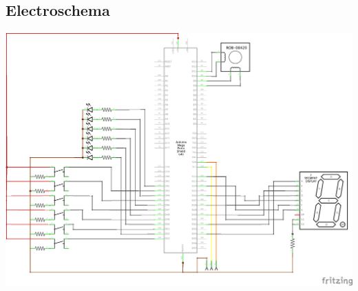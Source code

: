 \subsection{Electroschema}
\begin{center}
\includegraphics[width=0.7\textheight, angle = 0]{src/schema/motor_schema.png}
\end{center}
